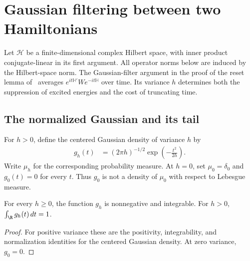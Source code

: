\section{Gaussian filtering between two Hamiltonians}
\label{sec:gaussian_filter}

Let $\mathcal H$ be a finite-dimensional complex Hilbert space, with inner
product conjugate-linear in its first argument. All operator norms below
are induced by the Hilbert-space norm. The Gaussian-filter argument in the
proof of the reset lemma of~\cite{OpenAI2026PolynomialPEPS} averages
$e^{it\mathbb H'}We^{-it\mathbb H}$ over time. Its variance $h$ determines
both the suppression of excited energies and the cost of truncating time.

\subsection{The normalized Gaussian and its tail}

\begin{definition}
    \label{def:gaussian_time_density}
    \leanok
    For $h>0$, define the centered Gaussian density of variance $h$ by
    \begin{align}
        g_h(t)&=(2\pi h)^{-1/2}\exp\!\left(-\frac{t^2}{2h}\right).
        \label{eq:gaussian_density}
    \end{align}
    Write $\mu_h$ for the corresponding probability measure. At $h=0$,
    set $\mu_0=\delta_0$ and $g_0(t)=0$ for every $t$.
    Thus $g_0$ is not a density of $\mu_0$ with respect to Lebesgue measure.
\end{definition}

\begin{theorem}
    \label{thm:gaussian_normalization}
    \leanok
    For every $h\ge0$, the function $g_h$ is nonnegative and integrable.
    For $h>0$, $\int_{\R}g_h(t)\,dt=1$.
\end{theorem}
\begin{proof}\leanok
    For positive variance these are the positivity, integrability, and
    normalization identities for the centered Gaussian density. At zero
    variance, $g_0=0$.
\end{proof}

